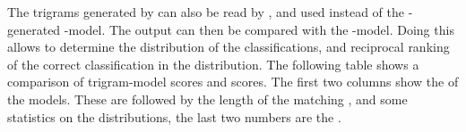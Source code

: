 \documentclass[a4paper,10pt,twoside]{report}
\begin{document}

The trigrams generated by \srilm{} can also be read by \wopr{}, and
used instead of the \wopr{}-generated \ngram{}-model. The output can
then be compared with the \wopr{} \ngram{}-model. Doing this allows
\wopr{} to determine the distribution of the classifications, and
reciprocal ranking of the correct classification in the
distribution. The following table shows a comparison of \wopr{}
trigram-model scores and \srilm{} scores. The first two columns show
the \ltenp{} of the models. These are followed by the length of the
matching \ngram{}, and some statistics on the distributions, the last
two numbers are the \rr{}.
\end{document}
